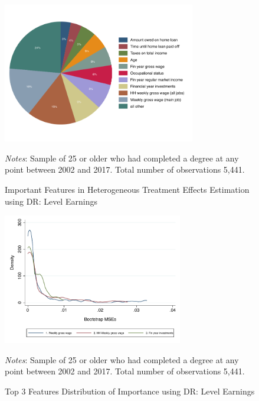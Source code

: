 \documentclass[12pt, a4paper]{article}
\begin{document}
\begin{figure}[H]
\centering
\caption{Important Features in Heterogeneous Treatment Effects Estimation using DR: Level Earnings}
\vspace{0.5cm}
  \label{fig:featgbrDR}
    \includegraphics[width=0.75\textwidth]{_figures/DR_influenceP_GBR_le_100.pdf}
\parbox{1\textwidth}{\footnotesize{\textit{Notes}: Sample of 25 or older who had completed a degree at any point between 2002 and 2017. Total number of observations 5,441.}}
\end{figure}

\begin{figure}[H]
\centering
\caption{Top 3 Features Distribution of Importance using DR: Level Earnings}
\vspace{0.5cm}
  \label{fig:dengbrlevDR} 
    \includegraphics[width=0.7\textwidth]{_figures/density_GBR_le_100_top3_DR.pdf}
\parbox{1\textwidth}{\footnotesize{\textit{Notes}: Sample of 25 or older who had completed a degree at any point between 2002 and 2017. Total number of observations 5,441.}}
\end{figure}

\end{document}
